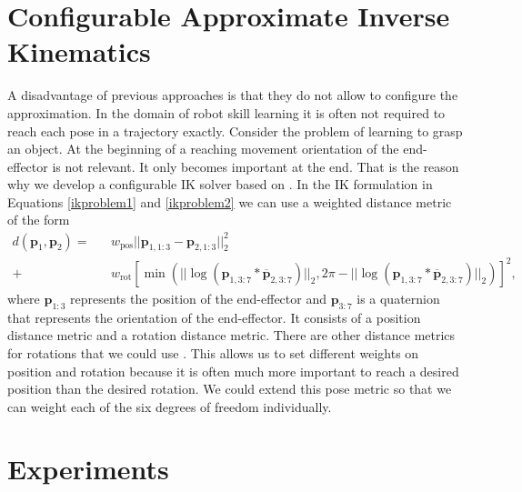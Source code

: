 \documentclass{svproc}
\begin{document}
\section{Configurable Approximate Inverse Kinematics}
A disadvantage of previous approaches is that they do not allow to
configure the approximation.
In the domain of robot skill learning it is often not required to reach
each pose in a trajectory exactly.
Consider the problem of learning to grasp an object. At the
beginning of a reaching movement orientation of the end-effector
is not relevant. It only becomes important at the end.
That is the reason why we develop a configurable IK
solver based on \cite{Beeson2015}.
In the IK formulation in Equations \ref{ikproblem1} and \ref{ikproblem2}
we can use a weighted distance metric of the form
\begin{eqnarray*}
d(\boldsymbol{p}_1, \boldsymbol{p}_2) =&&
  w_{\text{pos}}||\boldsymbol{p}_{1, 1:3} - \boldsymbol{p}_{2, 1:3}||_2^2\\
+&& w_{\text{rot}} \left[ \min(|| \log(\boldsymbol{p}_{1, 3:7} * \overline{\boldsymbol{p}}_{2, 3:7})||_2, 2 \pi - || \log(\boldsymbol{p}_{1, 3:7} * \overline{\boldsymbol{p}}_{2, 3:7})||_2)\right]^2,
\end{eqnarray*}
where $\boldsymbol{p}_{1:3}$ represents the position of the end-effector and
$\boldsymbol{p}_{3:7}$ is a quaternion that represents the orientation of the
end-effector.
It consists of a position distance metric and a rotation distance metric.
There are other distance metrics for rotations that we could use
\cite{Huynh2009}. This allows us to set different weights on position and
rotation because it is often much more important to reach a desired position
than the desired rotation. We could extend this pose metric so that
we can weight each of the six degrees of freedom individually.

\section{Experiments}
\end{document}
